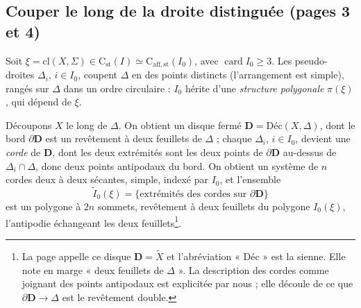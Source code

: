 \documentclass[11pt,a4paper]{article}
\begin{document}
\subsection*{Couper le long de la droite distinguée (pages 3 et 4)}

Soit $\xi = \mathrm{cl}(X, \Sigma) \in \mathrm{C}_{\mathrm{st}}(I) \simeq
\mathrm{C}_{\mathrm{aff,st}}(I_0)$, avec $\operatorname{card} I_0 \geqslant 3$.
Les pseudo-droites $\Delta_i$, $i \in I_0$, coupent $\Delta$ en des points
distincts (l'arrangement est simple), rangés sur $\Delta$ dans un ordre
circulaire : $I_0$ hérite d'une \emph{structure polygonale} $\pi(\xi)$, qui
dépend de $\xi$.

Découpons $X$ le long de $\Delta$. On obtient un disque fermé $\mathbf{D} =
\mathrm{Déc}(X, \Delta)$, dont le bord $\partial \mathbf{D}$ est un revêtement
à deux feuillets de $\Delta$ ; chaque $\Delta_i$, $i \in I_0$, devient une
\emph{corde} de $\mathbf{D}$, dont les deux extrémités sont les deux points
de $\partial\mathbf{D}$ au-dessus de $\Delta_i \cap \Delta$, donc deux
points antipodaux du bord. On obtient un système de $n$ cordes deux à deux
sécantes, simple, indexé par $I_0$, et l'ensemble
\[
\widetilde{I}_0(\xi) = \{\text{extrémités des cordes sur } \partial\mathbf{D}\}
\]
est un polygone à $2n$ sommets, revêtement à deux feuillets du polygone
$I_0(\xi)$, l'antipodie échangeant les deux feuillets\footnote{La page
appelle ce disque $\mathbf{D} = \widetilde{X}$ et l'abréviation
« $\mathrm{Déc}$ » est la sienne. Elle note en marge « deux feuillets de
$\Delta$ ». La description des cordes comme joignant des points antipodaux
est explicitée par nous ; elle découle de ce que $\partial\mathbf{D} \to
\Delta$ est le revêtement double.}.
\end{document}
